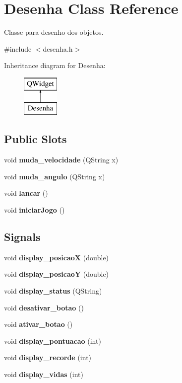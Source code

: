 \section{Desenha Class Reference}
\label{class_desenha}


Classe para desenho dos objetos.  




{\ttfamily \#include $<$desenha.\+h$>$}

Inheritance diagram for Desenha\+:\begin{figure}[H]
\begin{center}
\leavevmode
\includegraphics[height=2.000000cm]{class_desenha}
\end{center}
\end{figure}
\subsection*{Public Slots}
\begin{DoxyCompactItemize}
\item 
void {\bf muda\+\_\+velocidade} (Q\+String x)
\item 
void {\bf muda\+\_\+angulo} (Q\+String x)
\item 
void {\bf lancar} ()
\item 
void {\bf iniciar\+Jogo} ()
\end{DoxyCompactItemize}
\subsection*{Signals}
\begin{DoxyCompactItemize}
\item 
void {\bf display\+\_\+posicao\+X} (double)
\item 
void {\bf display\+\_\+posicao\+Y} (double)
\item 
void {\bf display\+\_\+status} (Q\+String)
\item 
void {\bf desativar\+\_\+botao} ()
\item 
void {\bf ativar\+\_\+botao} ()
\item 
void {\bf display\+\_\+pontuacao} (int)
\item 
void {\bf display\+\_\+recorde} (int)
\item 
void {\bf display\+\_\+vidas} (int)
\end{DoxyCompactItemize}
